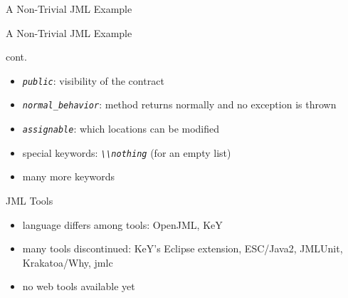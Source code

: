 \begin{frame}{A Non-Trivial JML Example}
	\begin{fancycolumns}[widths={45}]
		\begin{exampletight}{A Non-Trivial JML Example \mysource{\designofjml}}
			\centering\makebox{\usebox{\jmlisqrt}}
		\end{exampletight}
		\nextcolumn
		\begin{definition}{\insertsubsection{} cont.{} \mysource{\designofjml}}
			\begin{itemize}
				\item \emph{\lstinline|public|}: visibility of the contract
				\item \emph{\lstinline|normal_behavior|}: method returns normally and no exception is thrown
				\item \emph{\lstinline|assignable|}: which locations can be modified
				\item special keywords: \emph{\lstinline|\\nothing|} (for an empty list)
				\item many more keywords
			\end{itemize}
		\end{definition}
		\begin{note}{JML Tools}
			\begin{itemize}
				\item language differs among tools: OpenJML, KeY
				\item many tools discontinued: KeY's Eclipse extension, ESC/Java2, JMLUnit, Krakatoa/Why, jmlc
				\item no web tools available yet
			\end{itemize}
		\end{note}
	\end{fancycolumns}
\end{frame}


